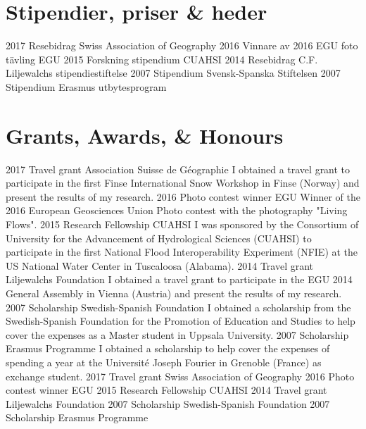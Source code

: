 \ifswedish
    \section{Stipendier, priser \& heder}
    \shortposition
        {2017}
        {Resebidrag}
        {Swiss Association of Geography}
    \shortposition
        {2016}
        {Vinnare av 2016 EGU foto tävling}
        {EGU}
    \shortposition
        {2015}
        {Forskning stipendium}
        {CUAHSI}
    \shortposition
        {2014}
        {Resebidrag}
        {C.F. Liljewalchs stipendiestiftelse}
    \shortposition
        {2007}
        {Stipendium}
        {Svensk-Spanska Stiftelsen}
    \shortposition
        {2007}
        {Stipendium}
        {Erasmus utbytesprogram}
\else
    \section{Grants, Awards, \& Honours}
    \ifacademic
    \position
        {2017}
        {Travel grant}
        {Association Suisse de Géographie}
        {I obtained a travel grant to participate in the first Finse International Snow Workshop in Finse (Norway) and present the results of my research.}
    \position
        {2016}
        {Photo contest winner}
        {EGU}
        {Winner of the 2016 European Geosciences Union Photo contest with the photography "Living Flows".}
    \position
        {2015}
        {Research Fellowship}
        {CUAHSI}
        {I was sponsored by the Consortium of University for the Advancement of Hydrological Sciences (CUAHSI) to participate in the first National Flood Interoperability Experiment (NFIE) at the US National Water Center in Tuscaloosa (Alabama).}
    \position
        {2014}
        {Travel grant}
        {Liljewalchs Foundation}
        {I obtained a travel grant to participate in the EGU 2014 General Assembly in Vienna (Austria) and present the results of my research.}
    \position
        {2007}
        {Scholarship}
        {Swedish-Spanish Foundation}
        {I obtained a scholarship from the Swedish-Spanish Foundation for the Promotion of Education and Studies to help cover the expenses as a Master student in Uppsala University.}
    \position
        {2007}
        {Scholarship}
        {Erasmus Programme}
        {I obtained a scholarship to help cover the expenses of spending a year at the Université Joseph Fourier in Grenoble (France) as exchange student.}
    \else
    \shortposition
        {2017}
        {Travel grant}
        {Swiss Association of Geography}
    \shortposition
        {2016}
        {Photo contest winner}
        {EGU}
    \shortposition
        {2015}
        {Research Fellowship}
        {CUAHSI}
    \shortposition
        {2014}
        {Travel grant}
        {Liljewalchs Foundation}
    \shortposition
        {2007}
        {Scholarship}
        {Swedish-Spanish Foundation}
    \shortposition
        {2007}
        {Scholarship}
        {Erasmus Programme}
    \fi
\fi
